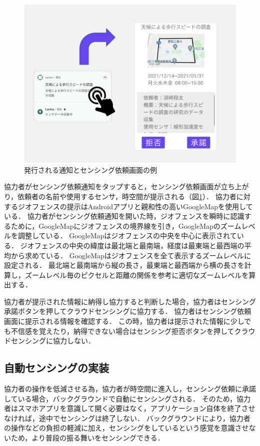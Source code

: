 \begin{figure}[tbh]
    \centering
    \includegraphics[width=16cm]{img_notify.png}
    \caption{発行される通知とセンシング依頼画面の例}
    \label{fig:notify}
\end{figure}


協力者がセンシング依頼通知をタップすると，センシング依頼画面が立ち上がり，依頼者の名前や使用するセンサ，時空間が提示される（図\ref{fig:notify}）．
協力者に対するジオフェンスの提示はAndroidアプリと親和性の高いGoogleMapを使用している．
協力者がセンシング依頼通知を開いた時，ジオフェンスを瞬時に認識するために，GoogleMapにジオフェンスの境界線を引き，GoogleMapのズームレベルを調整している．
GoogleMapはジオフェンスの中央を中心に表示されている．
ジオフェンスの中央の緯度は最北端と最南端，経度は最東端と最西端の平均から求めている．
GoogleMapはジオフェンスを全て表示するズームレベルに設定される．
最北端と最南端から縦の長さ，最東端と最西端から横の長さを計算し，ズームレベル毎のピクセルと距離の関係\cite{GoogleMap}を参考に適切なズームレベルを算出する．

協力者が提示された情報に納得し協力すると判断した場合，協力者はセンシング承諾ボタンを押してクラウドセンシングに協力する．
協力者はセンシング依頼画面に提示される情報を確認する．
この時，協力者は提示された情報に少しでも不信感を覚えたり，納得できない場合はセンシング拒否ボタンを押してクラウドセンシングに協力しない．



\subsection{自動センシングの実装}
\label{myApp_sensing}
協力者の操作を低減させる為，協力者が時空間に進入し，センシング依頼に承諾している場合，バックグラウンドで自動にセンシングされる．
そのため，協力者はスマホアプリを意識して開く必要はなく，アプリケーション自体を終了させなければ，途中でセンシングは終了しない．
バックグラウンドにより，協力者の操作などの負担の軽減に加え，センシングをしているという感覚を意識させないため，より普段の振る舞いをセンシングできる．


